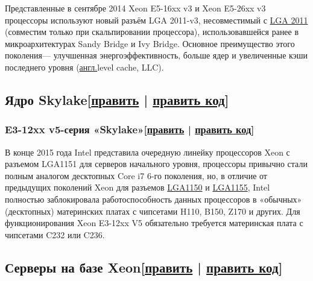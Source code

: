 \documentclass[a4paper,11pt]{article}
\begin{document}
Представленные в сентябре 2014 Xeon E5-16xx v3 и Xeon E5-26xx v3 процессоры используют новый разъём LGA 2011-v3, несовместимый с \href{https://ru.wikipedia.org/wiki/LGA_2011}{LGA 2011} (совместим только при скальпировании процессора), использовавшейся ранее в микроархитектурах Sandy Bridge и Ivy Bridge. Основное преимущество этого поколения\nolinebreak— улучшенная энергоэффективность, больше ядер и увеличенные кэши последнего уровня (\href{https://ru.wikipedia.org/wiki/%D0%90%D0%BD%D0%B3%D0%BB%D0%B8%D0%B9%D1%81%D0%BA%D0%B8%D0%B9_%D1%8F%D0%B7%D1%8B%D0%BA}{англ.}\nolinebreaklast level cache, LLC).

\subsection{Ядро Skylake[\href{https://ru.wikipedia.org/w/index.php?title=Xeon&amp;veaction=edit&amp;section=11}{править} | \href{https://ru.wikipedia.org/w/index.php?title=Xeon&amp;action=edit&amp;section=11}{править код}]}

\subsubsection{E3-12xx v5-серия «Skylake»[\href{https://ru.wikipedia.org/w/index.php?title=Xeon&amp;veaction=edit&amp;section=12}{править} | \href{https://ru.wikipedia.org/w/index.php?title=Xeon&amp;action=edit&amp;section=12}{править код}]}

В конце 2015 года Intel представила очередную линейку процессоров Xeon с разъемом LGA1151 для серверов начального уровня, процессоры привычно стали полным аналогом десктопных Core i7 6-го поколения, но, в отличие от предыдущих поколений Xeon для разъемов \href{https://ru.wikipedia.org/wiki/Lga1150}{LGA1150} и \href{https://ru.wikipedia.org/wiki/LGA1155}{LGA1155}, Intel полностью заблокировала работоспособность данных процессоров в «обычных» (десктопных) материнских платах с чипсетами H110, B150, Z170 и других. Для функционирования Xeon E3-12xx V5 обязательно требуется материнская плата с чипсетами C232 или C236.

\subsection{Серверы на базе Xeon[\href{https://ru.wikipedia.org/w/index.php?title=Xeon&amp;veaction=edit&amp;section=13}{править} | \href{https://ru.wikipedia.org/w/index.php?title=Xeon&amp;action=edit&amp;section=13}{править код}]}
\end{document}
